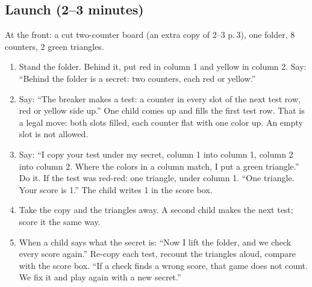 \documentclass[11pt]{article}
\begin{document}
\subsection{Launch (2--3 minutes)}
At the front: a cut two-counter board (an extra copy of 2--3 p.\,3), one folder, 8 counters, 2 green triangles.
\begin{enumerate}
\item Stand the folder. Behind it, put red in column 1 and yellow in column 2. Say: ``Behind the folder is a secret: two counters, each red or yellow.''
\item Say: ``The breaker makes a test: a counter in every slot of the next test row, red or yellow side up.'' One child comes up and fills the first test row. That is a legal move: both slots filled, each counter flat with one color up. An empty slot is not allowed.
\item Say: ``I copy your test under my secret, column 1 into column 1, column 2 into column 2. Where the colors in a column match, I put a green triangle.'' Do it. If the test was red-red: one triangle, under column 1. ``One triangle. Your score is 1.'' The child writes 1 in the score box.
\item Take the copy and the triangles away. A second child makes the next test; score it the same way.
\item When a child says what the secret is: ``Now I lift the folder, and we check every score again.'' Re-copy each test, recount the triangles aloud, compare with the score box. ``If a check finds a wrong score, that game does not count. We fix it and play again with a new secret.''
\end{enumerate}
\end{document}
